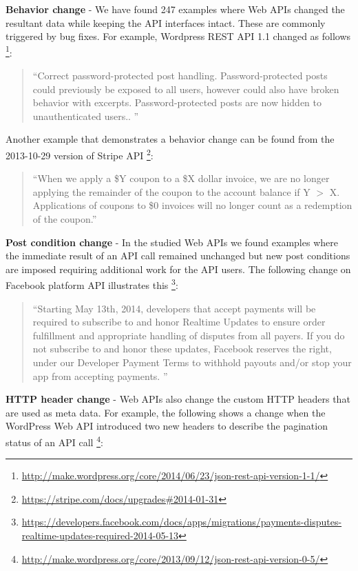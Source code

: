\textbf{Behavior change} - We have found 247 examples where Web APIs changed the resultant data while keeping the API interfaces intact. These are commonly triggered by bug fixes. For example, Wordpress REST API 1.1 changed as follows \footnote{\url{http://make.wordpress.org/core/2014/06/23/json-rest-api-version-1-1/}}:

\small
\begin{quotation}
``Correct password-protected post handling.
Password-protected posts could previously be exposed to all users, however
could also have broken behavior with excerpts. Password-protected posts are
now hidden to unauthenticated users..
''\end{quotation}
\normalsize

Another example that demonstrates a behavior change can be found from the 2013-10-29 version of Stripe API \footnote{\url{https://stripe.com/docs/upgrades\#2014-01-31}}:

\small
\begin{quotation}
``When we apply a \$Y coupon to a \$X dollar invoice, we are no longer applying the remainder of the coupon to the account balance if Y $>$ X. Applications of coupons to \$0 invoices will no longer count as a redemption of the coupon.''
\end{quotation}
\normalsize

\textbf{Post condition change} - In the studied Web APIs we found examples where the immediate result of an API call remained unchanged but new post conditions are imposed requiring additional work for the API users. The following change on Facebook platform API illustrates this \footnote{\url{https://developers.facebook.com/docs/apps/migrations/payments-disputes-realtime-updates-required-2014-05-13}}:

\small
\begin{quotation}
``Starting May 13th, 2014, developers that accept payments will be required to subscribe to and honor Realtime Updates to ensure order fulfillment and appropriate handling of disputes from all payers. If you do not subscribe to and honor these updates, Facebook reserves the right, under our Developer Payment Terms to withhold payouts and/or stop your app from accepting payments.
''\end{quotation}
\normalsize

\textbf{HTTP header change} - Web APIs also change the custom HTTP headers that are used as meta data. For example, the following shows a change when the WordPress Web API introduced two new headers to describe the pagination status of an API call \footnote{\url{http://make.wordpress.org/core/2013/09/12/json-rest-api-version-0-5/}}:

